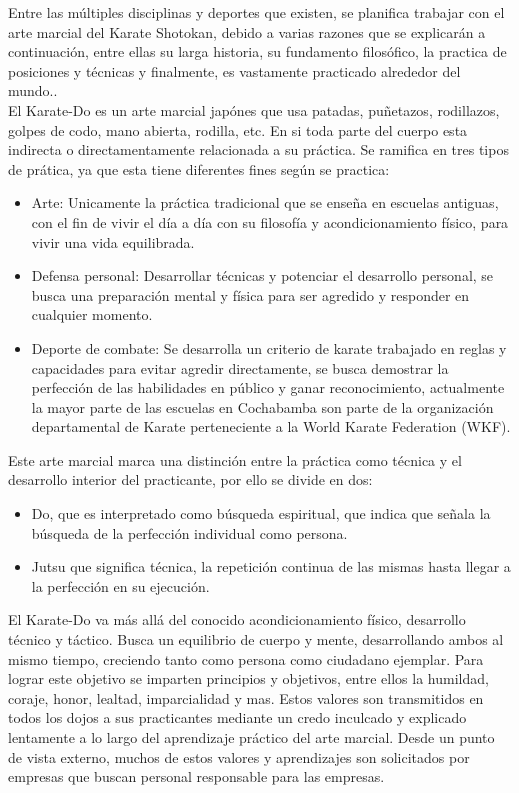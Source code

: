 Entre las múltiples disciplinas y deportes que existen, se planifica trabajar con el arte marcial del Karate Shotokan, debido a varias razones que se explicarán a continuación, entre ellas su larga historia, su fundamento filosófico, la practica de posiciones y técnicas y finalmente, es vastamente practicado alrededor del mundo.\cite{Inti}.\\

El Karate-Do es un arte marcial japónes que usa patadas, puñetazos, rodillazos, golpes de codo, mano abierta, rodilla, etc. En si toda parte del cuerpo esta indirecta o directamentamente relacionada a su práctica. Se ramifica en tres tipos de prática, ya que esta tiene diferentes fines según se practica:

\begin{itemize}
	\item Arte: Unicamente la práctica tradicional que se enseña en escuelas antiguas, con el fin de vivir el día a día con su filosofía y acondicionamiento físico, para vivir una vida equilibrada.
	\item Defensa personal: Desarrollar técnicas y potenciar el desarrollo personal, se busca una preparación mental y física para ser agredido y responder en cualquier momento.
	\item Deporte de combate: Se desarrolla un criterio de karate trabajado en reglas y capacidades para evitar agredir directamente, se busca demostrar la perfección de las habilidades en público y ganar reconocimiento, actualmente la mayor parte de las escuelas en Cochabamba son parte de la organización departamental de Karate perteneciente a la World Karate Federation (WKF).
\end{itemize}

Este arte marcial marca una distinción entre la práctica como técnica y el desarrollo interior del practicante, por ello se divide en dos:

\begin{itemize}
	\item Do, que es interpretado como búsqueda espiritual, que indica que señala la búsqueda de la perfección individual como persona.
	\item Jutsu que significa técnica, la repetición continua de las mismas hasta llegar a la perfección en su ejecución.
\end{itemize}

El Karate-Do va más allá del conocido acondicionamiento físico, desarrollo técnico y táctico. Busca un equilibrio de cuerpo y mente, desarrollando ambos al mismo tiempo, creciendo tanto como persona como ciudadano ejemplar. Para lograr este objetivo se imparten principios y objetivos, entre ellos la humildad, coraje, honor, lealtad, imparcialidad y mas. Estos valores son transmitidos en todos los dojos a sus practicantes mediante un credo inculcado y explicado lentamente a lo largo del aprendizaje práctico del arte marcial. Desde un punto de vista externo, muchos de estos valores y aprendizajes son solicitados por empresas que buscan personal responsable para las empresas.\\

